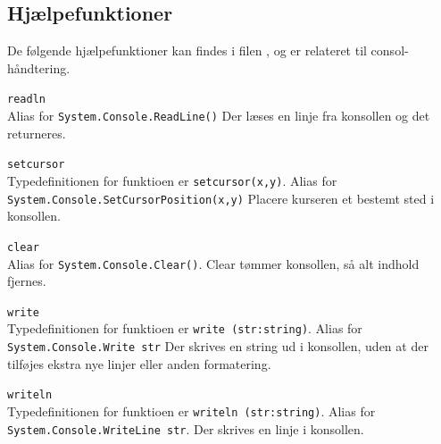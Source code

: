 \documentclass[a4paper]{article}
\begin{document}
    \subsection{Hjælpefunktioner} \label{ssec:helpers}
      De følgende hjælpefunktioner kan findes i filen , og er relateret til consol-håndtering.
      \begin{description}
      
        \item{\texttt{readln}}~\\
          Alias for \lstinline$System.Console.ReadLine()$
          Der læses en linje fra konsollen og det returneres.

        \item{\texttt{setcursor}}~\\
          Typedefinitionen for funktioen er \lstinline$setcursor(x,y)$.
          Alias for \lstinline$System.Console.SetCursorPosition(x,y)$
          Placere kurseren et bestemt sted i konsollen.

        \item{\texttt{clear}}~\\
          Alias for \lstinline$System.Console.Clear()$.
          Clear tømmer konsollen, så alt indhold fjernes.

        \item{\texttt{write}}~\\
          Typedefinitionen for funktioen er \lstinline$write (str:string)$.
          Alias for \lstinline$System.Console.Write str$
          Der skrives en string ud i konsollen, uden at der tilføjes ekstra nye linjer eller anden formatering.

        \item{\texttt{writeln}}~\\
          Typedefinitionen for funktioen er \lstinline$writeln (str:string)$.
          Alias for \lstinline$System.Console.WriteLine str$.
          Der skrives en linje i konsollen.
      \end{description}~\\
      
\end{document}
